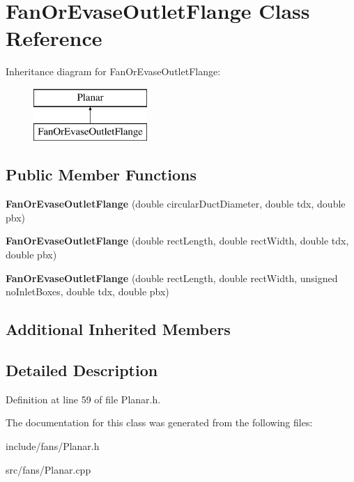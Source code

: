 \hypertarget{class_fan_or_evase_outlet_flange}{}\section{Fan\+Or\+Evase\+Outlet\+Flange Class Reference}
\label{class_fan_or_evase_outlet_flange}
Inheritance diagram for Fan\+Or\+Evase\+Outlet\+Flange\+:\begin{figure}[H]
\begin{center}
\leavevmode
\includegraphics[height=2.000000cm]{d7/de3/class_fan_or_evase_outlet_flange}
\end{center}
\end{figure}
\subsection*{Public Member Functions}
\begin{DoxyCompactItemize}
\item 
\mbox{\label{class_fan_or_evase_outlet_flange_aa5ffe09deb063462d9e1a08ce8ca3e79}} 
{\bfseries Fan\+Or\+Evase\+Outlet\+Flange} (double circular\+Duct\+Diameter, double tdx, double pbx)
\item 
\mbox{\label{class_fan_or_evase_outlet_flange_ac89f006b5b87e17db28f367447fe4f84}} 
{\bfseries Fan\+Or\+Evase\+Outlet\+Flange} (double rect\+Length, double rect\+Width, double tdx, double pbx)
\item 
\mbox{\label{class_fan_or_evase_outlet_flange_a836a77e2f8f96126c678d0a17638b436}} 
{\bfseries Fan\+Or\+Evase\+Outlet\+Flange} (double rect\+Length, double rect\+Width, unsigned no\+Inlet\+Boxes, double tdx, double pbx)
\end{DoxyCompactItemize}
\subsection*{Additional Inherited Members}


\subsection{Detailed Description}


Definition at line 59 of file Planar.\+h.



The documentation for this class was generated from the following files\+:\begin{DoxyCompactItemize}
\item 
include/fans/Planar.\+h\item 
src/fans/Planar.\+cpp\end{DoxyCompactItemize}
